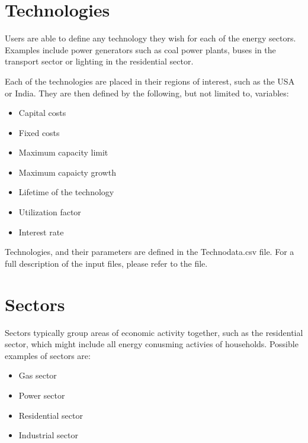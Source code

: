 \documentclass[letterpaper,10pt,english]{sphinxmanual}
\begin{document}
\section{Technologies}
\label{\detokenize{muse-components:technologies}}
Users are able to define any technology they wish for each of the energy sectors. Examples include power generators such as coal power plants, buses in the transport sector or lighting in the residential sector.

Each of the technologies are placed in their regions of interest, such as the USA or India. They are then defined by the following, but not limited to, variables:
\begin{itemize}
\item {} 
Capital costs

\item {} 
Fixed costs

\item {} 
Maximum capacity limit

\item {} 
Maximum capaicty growth

\item {} 
Lifetime of the technology

\item {} 
Utilization factor

\item {} 
Interest rate

\end{itemize}

Technologies, and their parameters are defined in the Technodata.csv file. For a full description of the input files, please refer to the {\hyperref[\detokenize{inputs/technodata:inputs-technodata}]{}} file.


\section{Sectors}
\label{\detokenize{muse-components:sectors}}
Sectors typically group areas of economic activity together, such as the residential sector, which might include all energy conusming activies of households. Possible examples of sectors are:
\begin{itemize}
\item {} 
Gas sector

\item {} 
Power sector

\item {} 
Residential sector

\item {} 
Industrial sector

\end{itemize}
\end{document}
